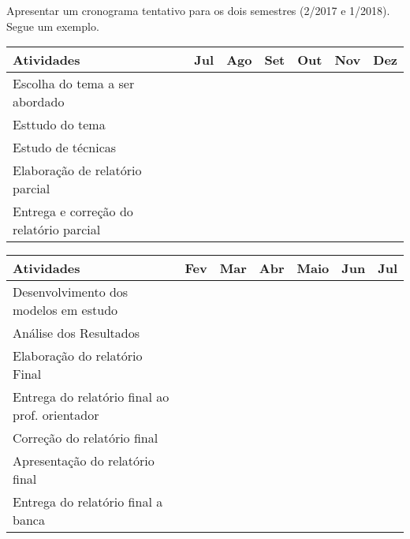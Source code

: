 Apresentar um cronograma tentativo para os dois semestres (2/2017 e 1/2018). Segue um exemplo.

	\def\tablename{Quadro} 
	\setlength{\extrarowheight}{0.2cm}
		\begin{table}[h]\scriptsize 
			\begin{tabular}{|l|c|c|c|c|c|c|} \hline
				\textbf{Atividades}	& Jul	& Ago	& Set	& Out	& Nov	& Dez \\ \hline	
				Escolha do tema a ser abordado & \cellcolor{gray} &&&&& \\ \hline	
				Esttudo do tema & & \cellcolor{gray} & \cellcolor{gray} &&& \\ \hline	
				Estudo de técnicas  & & \cellcolor{gray} & \cellcolor{gray} 
												&\cellcolor{blue}& & \\ \hline
				Elaboração de relatório parcial & &&& & \cellcolor{blue} & \\ \hline
				Entrega e correção do relatório parcial & &&&& & \cellcolor{blue} \\ \hline	
        	\end{tabular}
		\end{table}
		
	\def\tablename{Quadro} 
	\setlength{\extrarowheight}{0.2cm}
		\begin{table}[h]\scriptsize 
			\begin{tabular}{|l|c|c|c|c|c|c|} \hline
				\textbf{Atividades}	& Fev & Mar	& Abr	& Maio	& Jun	& Jul	\\ \hline	
				Desenvolvimento dos modelos em estudo & \cellcolor{blue} &&&&& \\ \hline	
				Análise dos Resultados & & \cellcolor{blue} &&&& \\ \hline	
				Elaboração do relatório Final & & \cellcolor{blue} & \cellcolor{blue} 
												&\cellcolor{blue}& & \\ \hline
				Entrega do relatório final ao prof. orientador & &&& & \cellcolor{blue} & \\ \hline
				Correção do relatório final & &&&& & \cellcolor{blue} \\ \hline
       			Apresentação do relatório final & &&&& & \cellcolor{blue} \\ \hline
				Entrega do relatório final a banca & &&&& & \cellcolor{blue} \\ \hline	
        	\end{tabular}
		\end{table}